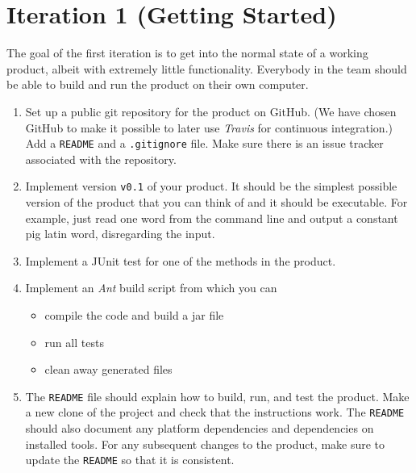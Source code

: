 \documentclass[swedish,english]{article}
\begin{document}
\newpage

\section*{Iteration 1 (Getting Started)}
The goal of the first iteration is to get into the normal state of a working product, albeit with extremely little functionality. Everybody in the team should be able to build and run the product on their own computer.

\begin{enumerate}

\item Set up a public git repository for the product on GitHub. (We have chosen GitHub to make it possible to later use \emph{Travis} for continuous integration.) Add a \verb'README' and a \verb'.gitignore' file. Make sure there is an issue tracker associated with the repository.

\item Implement version \verb'v0.1' of your product. It should be the simplest possible version of the product that you can think of and it should be executable. For example, just read one word from the command line and output a constant pig latin word, disregarding the input.

\item Implement a JUnit test for one of the methods in the  product.


\item Implement an \emph{Ant} build script from which you can
\begin{itemize}
  \item compile the code and build a jar file
  \item run all tests
  \item clean away generated files
\end{itemize}

\item The \verb'README' file should explain how to build, run, and test the product. Make a new clone of the project and check that the instructions work. The \verb'README' should also document any platform dependencies and dependencies on installed tools. For any subsequent changes to the product, make sure to update the \verb'README' so that it is consistent.


\end{enumerate}
\end{document}
